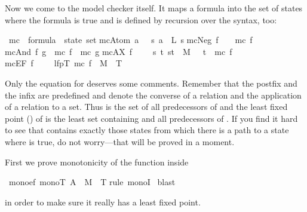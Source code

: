 \begin{isabellebody}
\begin{isamarkuptext}
Now we come to the model checker itself. It maps a formula into the set of
states where the formula is true and is defined by recursion over the syntax,
too:%
\end{isamarkuptext}%
\ mc\ {\isacharcolon}{\isacharcolon}\ {\isachardoublequote}formula\ {\isasymRightarrow}\ state\ set{\isachardoublequote}\isanewline
{}\isanewline
{\isachardoublequote}mc{\isacharparenleft}Atom\ a{\isacharparenright}\ \ {\isacharequal}\ {\isacharbraceleft}s{\isachardot}\ a\ {\isasymin}\ L\ s{\isacharbraceright}{\isachardoublequote}\isanewline
{\isachardoublequote}mc{\isacharparenleft}Neg\ f{\isacharparenright}\ \ \ {\isacharequal}\ {\isacharminus}mc\ f{\isachardoublequote}\isanewline
{\isachardoublequote}mc{\isacharparenleft}And\ f\ g{\isacharparenright}\ {\isacharequal}\ mc\ f\ {\isasyminter}\ mc\ g{\isachardoublequote}\isanewline
{\isachardoublequote}mc{\isacharparenleft}AX\ f{\isacharparenright}\ \ \ \ {\isacharequal}\ {\isacharbraceleft}s{\isachardot}\ {\isasymforall}t{\isachardot}\ {\isacharparenleft}s{\isacharcomma}t{\isacharparenright}\ {\isasymin}\ M\ \ {\isasymlongrightarrow}\ t\ {\isasymin}\ mc\ f{\isacharbraceright}{\isachardoublequote}\isanewline
{\isachardoublequote}mc{\isacharparenleft}EF\ f{\isacharparenright}\ \ \ \ {\isacharequal}\ lfp{\isacharparenleft}{\isasymlambda}T{\isachardot}\ mc\ f\ {\isasymunion}\ M{\isacharcircum}{\isacharminus}{}\ {\isacharcircum}{\isacharcircum}\ T{\isacharparenright}{\isachardoublequote}%
\begin{isamarkuptext}%
\noindent
Only the equation for  deserves some comments. Remember that the
postfix  and the infix \isa{{\isacharcircum}{\isacharcircum}} are predefined and denote the
converse of a relation and the application of a relation to a set. Thus
 is the set of all predecessors of  and the least
fixed point () of  is the least set
 containing  and all predecessors of . If you
find it hard to see that  contains exactly those states from
which there is a path to a state where  is true, do not worry---that
will be proved in a moment.

First we prove monotonicity of the function inside %
\end{isamarkuptext}%
\ mono{\isacharunderscore}ef{\isacharcolon}\ {\isachardoublequote}mono{\isacharparenleft}{\isasymlambda}T{\isachardot}\ A\ {\isasymunion}\ M{\isacharcircum}{\isacharminus}{}\ {\isacharcircum}{\isacharcircum}\ T{\isacharparenright}{\isachardoublequote}\isanewline
{}rule\ monoI{\isacharparenright}\isanewline
{}\ blast\isanewline
{}%
\begin{isamarkuptext}%
\noindent
in order to make sure it really has a least fixed point.


\end{isamarkuptext}
\end{isabellebody}
